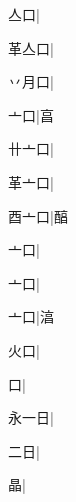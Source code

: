 \begin{multicols}{2}
{{\cjk{}{\cnsym{}　}亼口}\mktsJzrVerticalBar{}{\cjk{}{\cnsym{}　}{\cnsym{}　}{\cnsym{}　}}|{}\par
{\cjk{}革亼口}\mktsJzrVerticalBar{}{\cjk{}{\cnsym{}　}{\cnsym{}　}{\cnsym{}　}}|{}\par
{\cjk{}丷月口}|{}\par
{\cjk{}{\cnsym{}　}亠口}\mktsJzrVerticalBar{}{\cjk{}{\cnsym{}　}{\cnsym{}　}{\cnsym{}　}}|{\cjk{}亯}\par
{\cjk{}卄亠口}\mktsJzrVerticalBar{}{\cjk{}{\cnsym{}　}{\cnsym{}　}{\cnsym{}　}}|{}\par
{\cjk{}革亠口}\mktsJzrVerticalBar{}{\cjk{}{\cnsym{}　}{\cnsym{}　}{\cnsym{}　}}|{}\par
{\cjk{}酉亠口}\mktsJzrVerticalBar{}{\cjk{}{\cnsym{}　}{\cnsym{}　}{\cnsym{}　}}|{\cjk{}醕}\par
{亠口}\mktsJzrVerticalBar{}{\cjk{}{\cnsym{}　}{\cnsym{}　}{\cnsym{}　}}|{}\par
{亠口}\mktsJzrVerticalBar{}{\cjk{}{\cnsym{}　}{\cnsym{}　}{\cnsym{}　}}|{}\par
{亠口}\mktsJzrVerticalBar{}{\cjk{}{\cnsym{}　}{\cnsym{}　}{\cnsym{}　}}|{\cjk{}湻}\par
{\cjk{}{\cnsym{}　}火口}\mktsJzrVerticalBar{}{\cjk{}{\cnsym{}　}{\cnsym{}　}{\cnsym{}　}}|{}\par
{口}\mktsJzrVerticalBar{}{\cjk{}{\cnsym{}　}{\cnsym{}　}{\cnsym{}　}}|{}\par
{\cjk{}永一日}\mktsJzrVerticalBar{}{\cjk{}{\cnsym{}　}{\cnsym{}　}{\cnsym{}　}}|{}\par
{\cjk{}{\cnsym{}　}二日}\mktsJzrVerticalBar{}{\cjk{}{\cnsym{}　}{\cnsym{}　}{\cnsym{}　}}|{}\par
{\cjk{}{\cnsym{}　}{\cnsym{}　}晶}\mktsJzrVerticalBar{}{\cjk{}{\cnsym{}　}{\cnsym{}　}{\cnsym{}　}}|{}\par
}
\end{multicols}
